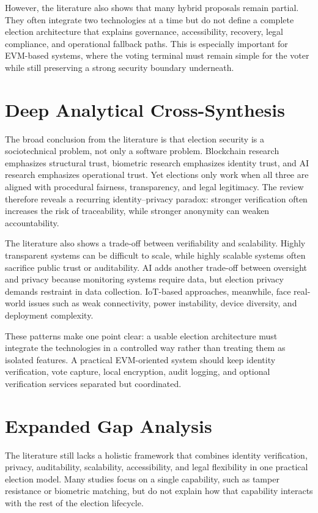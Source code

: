 However, the literature also shows that many hybrid proposals remain partial. They often integrate two technologies at a time but do not define a complete election architecture that explains governance, accessibility, recovery, legal compliance, and operational fallback paths. This is especially important for EVM-based systems, where the voting terminal must remain simple for the voter while still preserving a strong security boundary underneath.

\section{Deep Analytical Cross-Synthesis}
The broad conclusion from the literature is that election security is a sociotechnical problem, not only a software problem. Blockchain research emphasizes structural trust, biometric research emphasizes identity trust, and AI research emphasizes operational trust. Yet elections only work when all three are aligned with procedural fairness, transparency, and legal legitimacy. The review therefore reveals a recurring identity--privacy paradox: stronger verification often increases the risk of traceability, while stronger anonymity can weaken accountability.

The literature also shows a trade-off between verifiability and scalability. Highly transparent systems can be difficult to scale, while highly scalable systems often sacrifice public trust or auditability. AI adds another trade-off between oversight and privacy because monitoring systems require data, but election privacy demands restraint in data collection. IoT-based approaches, meanwhile, face real-world issues such as weak connectivity, power instability, device diversity, and deployment complexity.

These patterns make one point clear: a usable election architecture must integrate the technologies in a controlled way rather than treating them as isolated features. A practical EVM-oriented system should keep identity verification, vote capture, local encryption, audit logging, and optional verification services separated but coordinated.

\section{Expanded Gap Analysis}
The literature still lacks a holistic framework that combines identity verification, privacy, auditability, scalability, accessibility, and legal flexibility in one practical election model. Many studies focus on a single capability, such as tamper resistance or biometric matching, but do not explain how that capability interacts with the rest of the election lifecycle.

